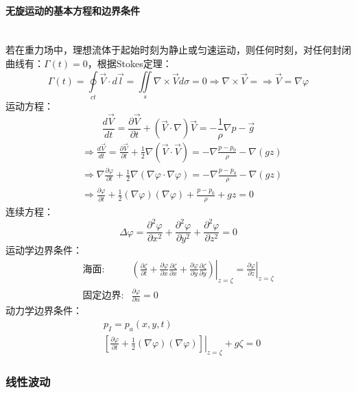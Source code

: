 \documentclass[a4paper,12pt]{article}
\begin{document}
    \paragraph{无旋运动的基本方程和边界条件}~{}\\
    若在重力场中，理想流体于起始时刻为静止或匀速运动，则任何时刻，对任何封闭曲线有：$\Gamma(t)=0$，根据Stokes定理：
    \[
        \Gamma(t)=\oint\limits_{c t} \vec{V} \cdot d \vec{l}=\iint\limits_{s} \nabla \times \vec{V} d \sigma=0\Rightarrow\nabla\times\vec{V}=\Rightarrow\vec{V}=\nabla \varphi
    \]
    运动方程：
    \[
            \frac{d\vec{V}}{dt}=\frac{\partial \vec{V}}{\partial t}+(\vec{V}\cdot\nabla)\vec{V}=-\frac{1}{\rho}\nabla p-\vec{g}
    \]
    \[
        \begin{aligned}
            &\Rightarrow \frac{d\vec{V}}{dt}=\frac{\partial \vec{V}}{\partial t}+\frac{1}{2}\nabla(\vec{V}\cdot\vec{V})=-\nabla\frac{p-p_0}{\rho}-\nabla(gz)\\
            &\Rightarrow \nabla\frac{\partial \varphi}{\partial t}+\frac{1}{2}\nabla(\nabla\varphi\cdot\nabla\varphi)=-\nabla\frac{p-p_0}{\rho}-\nabla(gz)\\
            &\Rightarrow \frac{\partial \varphi}{\partial t}+\frac{1}{2}(\nabla \varphi)(\nabla \varphi)+\frac{p-p_{0}}{\rho}+g z=0
        \end{aligned}
    \]
    连续方程：
    \[
        \Delta \varphi=\frac{\partial^{2} \varphi}{\partial x^{2}}+\frac{\partial^{2} \varphi}{\partial y^{2}}+\frac{\partial^{2} \varphi}{\partial z^{2}}=0
    \]
    运动学边界条件： 
    \[
        \begin{aligned}
            \mbox{海面}:&\left.\left(\frac{\partial \zeta}{\partial t}+\frac{\partial \varphi}{\partial x} \frac{\partial \zeta}{\partial x}+\frac{\partial \varphi}{\partial y} \frac{\partial \zeta}{\partial y}\right)\right|_{z=\zeta}=\left.\frac{\partial \varphi}{\partial z}\right|_{z=\zeta} \\
            \mbox{固定边界}:&\frac{\partial \varphi}{\partial n}=0
        \end{aligned}
    \]
    动力学边界条件： 
    \[
        \begin{aligned}
            &p_{I}=p_{a}(x, y, t) \\
            &{\left.\left[\frac{\partial \varphi}{\partial t}+\frac{1}{2}(\nabla \varphi)(\nabla \varphi)\right]\right|_{z=\zeta}+g \zeta=0}
        \end{aligned}
    \]
    \subsubsection{线性波动}
\end{document}
